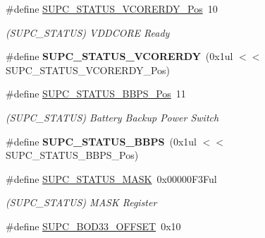 \begin{DoxyCompactItemize}
\item 
\hypertarget{group___s_a_m_l21___s_u_p_c_ga9e2da182cb656e1be25d3f719b006cd4}{}\#define \hyperlink{group___s_a_m_l21___s_u_p_c_ga9e2da182cb656e1be25d3f719b006cd4}{S\+U\+P\+C\+\_\+\+S\+T\+A\+T\+U\+S\+\_\+\+V\+C\+O\+R\+E\+R\+D\+Y\+\_\+\+Pos}~10\label{group___s_a_m_l21___s_u_p_c_ga9e2da182cb656e1be25d3f719b006cd4}

\begin{DoxyCompactList}\small\item\em (S\+U\+P\+C\+\_\+\+S\+T\+A\+T\+U\+S) V\+D\+D\+C\+O\+R\+E Ready \end{DoxyCompactList}\item 
\hypertarget{group___s_a_m_l21___s_u_p_c_gae9c94fb0928c147d9c049d23bcee4b41}{}\#define {\bfseries S\+U\+P\+C\+\_\+\+S\+T\+A\+T\+U\+S\+\_\+\+V\+C\+O\+R\+E\+R\+D\+Y}~(0x1ul $<$$<$ S\+U\+P\+C\+\_\+\+S\+T\+A\+T\+U\+S\+\_\+\+V\+C\+O\+R\+E\+R\+D\+Y\+\_\+\+Pos)\label{group___s_a_m_l21___s_u_p_c_gae9c94fb0928c147d9c049d23bcee4b41}

\item 
\hypertarget{group___s_a_m_l21___s_u_p_c_ga0717debf46ca233c8f7be9dd45a0eb80}{}\#define \hyperlink{group___s_a_m_l21___s_u_p_c_ga0717debf46ca233c8f7be9dd45a0eb80}{S\+U\+P\+C\+\_\+\+S\+T\+A\+T\+U\+S\+\_\+\+B\+B\+P\+S\+\_\+\+Pos}~11\label{group___s_a_m_l21___s_u_p_c_ga0717debf46ca233c8f7be9dd45a0eb80}

\begin{DoxyCompactList}\small\item\em (S\+U\+P\+C\+\_\+\+S\+T\+A\+T\+U\+S) Battery Backup Power Switch \end{DoxyCompactList}\item 
\hypertarget{group___s_a_m_l21___s_u_p_c_gab1f1bc2f9aefb41b06f4c0709b557627}{}\#define {\bfseries S\+U\+P\+C\+\_\+\+S\+T\+A\+T\+U\+S\+\_\+\+B\+B\+P\+S}~(0x1ul $<$$<$ S\+U\+P\+C\+\_\+\+S\+T\+A\+T\+U\+S\+\_\+\+B\+B\+P\+S\+\_\+\+Pos)\label{group___s_a_m_l21___s_u_p_c_gab1f1bc2f9aefb41b06f4c0709b557627}

\item 
\hypertarget{group___s_a_m_l21___s_u_p_c_gacaccc4b9e1b787f7d567610ed042bb68}{}\#define \hyperlink{group___s_a_m_l21___s_u_p_c_gacaccc4b9e1b787f7d567610ed042bb68}{S\+U\+P\+C\+\_\+\+S\+T\+A\+T\+U\+S\+\_\+\+M\+A\+S\+K}~0x00000\+F3\+Ful\label{group___s_a_m_l21___s_u_p_c_gacaccc4b9e1b787f7d567610ed042bb68}

\begin{DoxyCompactList}\small\item\em (S\+U\+P\+C\+\_\+\+S\+T\+A\+T\+U\+S) M\+A\+S\+K Register \end{DoxyCompactList}\item 
\hypertarget{group___s_a_m_l21___s_u_p_c_ga49a799aaafe952446af4eae5679e0444}{}\#define \hyperlink{group___s_a_m_l21___s_u_p_c_ga49a799aaafe952446af4eae5679e0444}{S\+U\+P\+C\+\_\+\+B\+O\+D33\+\_\+\+O\+F\+F\+S\+E\+T}~0x10\label{group___s_a_m_l21___s_u_p_c_ga49a799aaafe952446af4eae5679e0444}


\end{DoxyCompactItemize}
